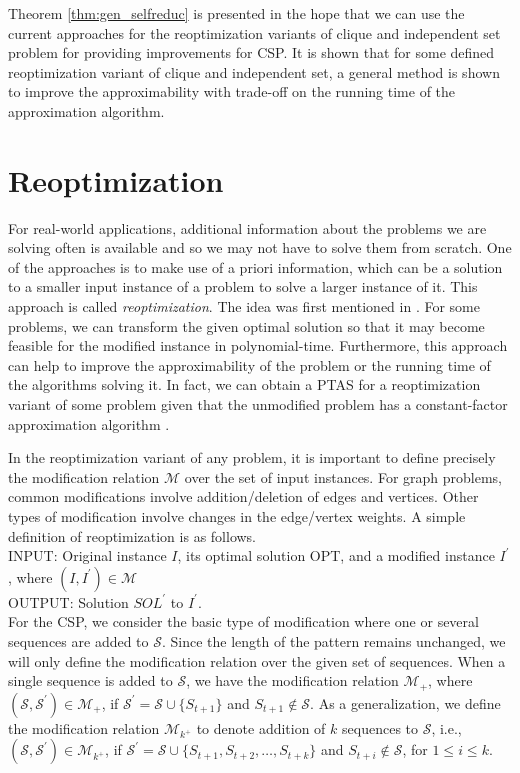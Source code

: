 \documentclass[journal]{acm_proc_article-sp}
\begin{document}
Theorem \ref{thm:gen_selfreduc} is presented in the hope that we can use the current approaches for the reoptimization variants of  clique and independent set problem for providing improvements for CSP. It is shown that for some defined reoptimization variant of clique and independent set, a general method is shown to improve the approximability with trade-off on the running time of the approximation algorithm.

\section{Reoptimization}

For real-world applications, additional information about the problems we are solving often is available and so we may not have to solve them from scratch. One of the approaches is to make use of a priori information, which can be a solution to a smaller input instance of a problem to solve a larger instance of it. This approach is called \textit{reoptimization}. The idea was first mentioned in \cite{Schaffter1997}. For some problems, we can transform the given optimal solution so that it may become feasible for the modified instance in polynomial-time. Furthermore, this approach can help to improve the approximability of the problem or the running time of the algorithms solving it. In fact, we can obtain a PTAS for a reoptimization variant of some problem given that the unmodified problem has a constant-factor approximation algorithm \cite{Bockenhauer2008}. 

In the reoptimization variant of any problem, it is important to define precisely the modification relation $\mathcal{M}$ over the set of input instances.  For graph problems, common modifications involve addition/deletion of edges and vertices. Other types of modification involve changes in the edge/vertex weights. A simple definition of reoptimization is as follows.\\


\noindent INPUT: Original instance $I$, its optimal solution OPT, and a modified instance $I^\prime$, where $(I,I^\prime) \in \mathcal{M}$ \\
\noindent OUTPUT: Solution $SOL^\prime$ to $I^\prime$.\\

For the CSP, we consider the basic type of modification where one  or several sequences are added to $\mathcal{S}$. Since the length of the pattern remains unchanged, we will only define the modification relation over the given set of sequences. When a single sequence is added to $\mathcal{S}$, we have the modification relation $ \mathcal{M}_+$, where $(\mathcal{S},\mathcal{S}^\prime) \in \mathcal{M}_+$, if $\mathcal{S}^\prime= \mathcal{S} \cup \{S_{t+1}\}$ and $S_{t+1} \notin \mathcal{S}$. As a generalization, we define the modification relation $\mathcal{M}_{k^+}$ to denote addition of $k$ sequences to $\mathcal{S}$, i.e., $(\mathcal{S}, \mathcal{S}^\prime) \in \mathcal{M}_{k^+}$, if $\mathcal{S}^\prime = \mathcal{S} \cup \{S_{t+1}, S_{t+2}, \ldots, S_{t+k}\}$ and $S_{t+i} \notin \mathcal{S}$, for $1 \leq i \leq k$.
\end{document}
